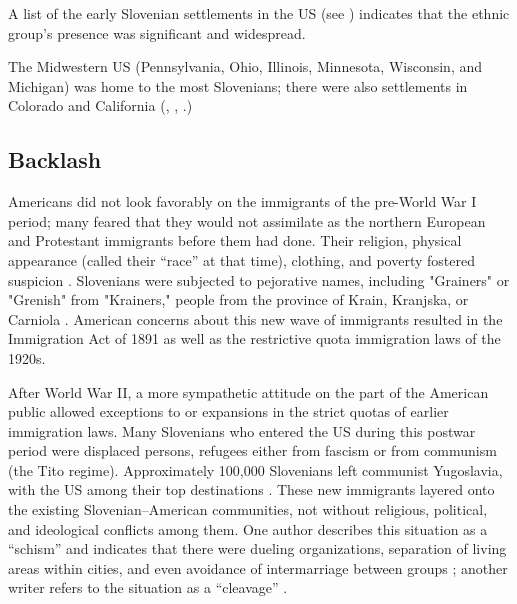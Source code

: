 \documentclass[output=paper,colorlinks,citecolor=brown,arabicfont,chinesefont]{langscibook}
\begin{document}
A list of the early Slovenian settlements in the US (see ) indicates that the ethnic group’s presence was significant and widespread.

\begin{table}
\caption{Early Slovenian Settlements in the US (\citealt{Gobetz2014}, \citealt{Klemencic1986}, \citealt{Zugel1987}}
\label{tab:slovenian-settlements}
\end{table}

The Midwestern US (Pennsylvania, Ohio, Illinois, Minnesota, Wisconsin, and Michigan) was home to the most Slovenians; there were also settlements in Colorado and California (\citealt{Gobetz2014}, \citealt{Klemencic1986}, \citealt{Zugel1987}.) 

\subsection{Backlash}

Americans did not look favorably on the immigrants of the pre-World War I period; many feared that they would not assimilate as the northern European and Protestant immigrants before them had done. Their religion, physical appearance (called their “race” at that time), clothing, and poverty fostered suspicion \citep{Gerber2011}. Slovenians were subjected to pejorative names, including "Grainers" or "Grenish" from "Krainers," people from the province of Krain, Kranjska, or Carniola \citep{Gobetz2014}. American concerns about this new wave of immigrants resulted in the Immigration Act of 1891 \citep{Hoyt2017} as well as the restrictive quota immigration laws of the 1920s.

After World War II, a more sympathetic attitude on the part of the American public allowed exceptions to or expansions in the strict quotas of earlier immigration laws. Many Slovenians who entered the US during this postwar period were displaced persons, refugees either from fascism or from communism (the Tito regime). Approximately 100,000 Slovenians left communist Yugoslavia, with the US among their top destinations \citep{Barkeretal2023}. These new immigrants layered onto the existing Slovenian–American communities, not without religious, political, and ideological conflicts among them. One author describes this situation as a “schism” and indicates that there were dueling organizations, separation of living areas within cities, and even avoidance of intermarriage between groups \citep{Milharcic-hladnik2007}; another writer refers to the situation as a “cleavage” \citep{Susel}.
\end{document}
